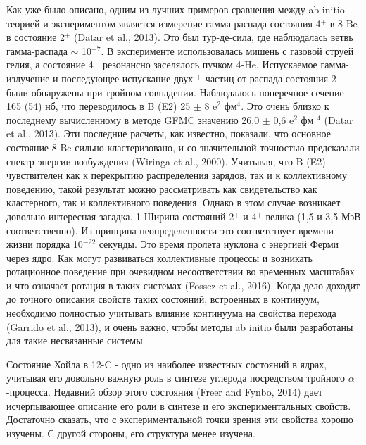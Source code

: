 \documentclass[fontsize=14pt]{scrarticle}
\begin{document}
Как уже было описано, одним из лучших примеров сравнения между ab initio теорией и экспериментом является измерение гамма-распада состояния 4$^{+}$ в 8-Be в состояние 2$^{+}$ (Datar et al., 2013). Это был тур-де-сила, где наблюдалась ветвь гамма-распада $\sim$ 10$^{-7}$. В эксперименте использовалась мишень с газовой струей гелия, а состояние 4$^{+}$ резонансно заселялось пучком 4-He. Испускаемое гамма-излучение и последующее испускание двух $^{+}$-частиц от распада состояния 2$^{+}$ были обнаружены при тройном совпадении. Наблюдалось поперечное сечение 165 (54) нб, что переводилось в B (E2) 25 $\pm$ 8 e$^{2}$ фм$^{4}$. Это очень близко к последнему вычисленному в методе GFMC значению 26,0 $\pm$ 0,6 e$^{2}$ фм $^{4}$ (Datar et al., 2013). Эти последние расчеты, как известно, показали, что основное состояние 8-Be сильно кластеризовано, и со значительной точностью предсказали спектр энергии возбуждения (Wiringa et al., 2000). Учитывая, что B (E2) чувствителен как к перекрытию распределения зарядов, так и к коллективному поведению, такой результат можно рассматривать как свидетельство как кластерного, так и коллективного поведения. Однако в этом случае возникает довольно интересная загадка. 1 Ширина состояний 2$^{+}$ и 4$^{+}$ велика (1,5 и 3,5 МэВ соответственно). Из принципа неопределенности это соответствует времени жизни порядка 10$^{-22}$ секунды. Это время пролета нуклона с энергией Ферми через ядро. Как могут развиваться коллективные процессы и возникать ротационное поведение при очевидном несоответствии во временных масштабах и что означает ротация в таких системах (Fossez et al., 2016). Когда дело доходит до точного описания свойств таких состояний, встроенных в континуум, необходимо полностью учитывать влияние континуума на свойства перехода (Garrido et al., 2013), и очень важно, чтобы методы ab initio были разработаны для такие несвязанные системы.

Состояние Хойла в 12-C - одно из наиболее известных состояний в ядрах, учитывая его довольно важную роль в синтезе углерода посредством тройного $\alpha$-процесса. Недавний обзор этого состояния (Freer and Fynbo, 2014) дает исчерпывающее описание его роли в синтезе и его экспериментальных свойств. Достаточно сказать, что с экспериментальной точки зрения эти свойства хорошо изучены. С другой стороны, его структура менее изучена.
\end{document}
